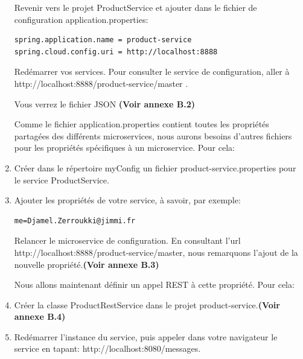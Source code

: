 \begin{enumerate}
    	Revenir vers le projet ProductService et ajouter dans le fichier de configuration application.properties:
\begin{lstlisting}
spring.application.name = product-service
spring.cloud.config.uri = http://localhost:8888
\end{lstlisting}
    	
    	Redémarrer vos services. Pour consulter le service de configuration, aller à {\color{red} http://localhost:8888/product-service/master} .
    	
    	Vous verrez le fichier JSON  \textbf{(Voir annexe B.2)}
    
    	Comme le fichier application.properties contient toutes les propriétés partagées des différents microservices, nous aurons besoins d'autres fichiers pour les propriétés spécifiques à un microservice. Pour cela:
    	
    	\item Créer dans le répertoire myConfig un fichier product-service.properties pour le service ProductService.
    	
    	\item  Ajouter les propriétés de votre service, à savoir, par exemple:
    	
\begin{lstlisting}
me=Djamel.Zerroukki@jimmi.fr
\end{lstlisting} 
    	
    	Relancer le microservice de configuration. En consultant l'url {\color{red}http://localhost:8888/product-service/master}, nous remarquons l'ajout de la nouvelle propriété.\textbf{(Voir annexe B.3)}
    	 
    	Nous allons maintenant définir un appel REST à cette propriété. Pour cela:
    	
    	\item Créer la classe ProductRestService dans le projet product-service.\textbf{(Voir annexe B.4)}
    	
  
    	
    	
    	\item Redémarrer l'instance  du service, puis appeler dans votre navigateur le service en tapant: {\color{red} http://localhost:8080/messages}. 
    	
    	
    	
    \end{enumerate}
    
    
    
    
    
    
